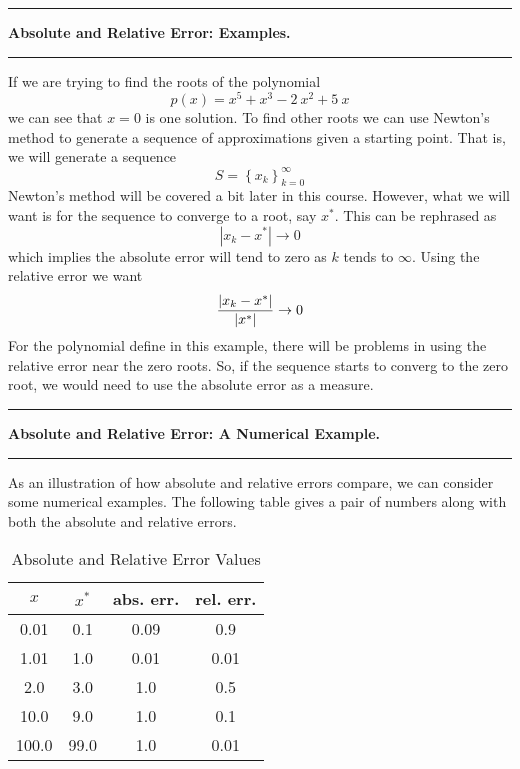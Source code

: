 \documentclass[10pt,fleqn]{article}
\begin{document}
\vskip0.1in\hrule\vskip0.1in
\noindent
{\bf Absolute and Relative Error: Examples.} 
\vskip0.1in\hrule\vskip0.1in
\noindent
If we are trying to find the roots of the polynomial
$$
  p(x) = x^5 + x^3 - 2\ x^2 + 5\ x
$$
we can see that $x=0$ is one solution. To find other roots we can use Newton's
method to generate a sequence of approximations given a starting point. That is,
we will generate a sequence
$$
   S = \left\lbrace x_k \right\rbrace_{k=0}^{\infty}
$$
Newton's method will be covered a bit later in this course. However, what we
will want is for the sequence to converge to a root, say $x^*$. This can be
rephrased as
$$ | x_k - x^* | \rightarrow 0 $$
which implies the absolute error will tend to zero as $k$ tends to $\infty$.
Using the relative error we want
$$ {{ | x_k - x^* | }\over{ | x^* | }} \rightarrow 0 $$
For the polynomial define in this example, there will be problems in using the
relative error near the zero roots. So, if the sequence starts to converg to the
zero root, we would need to use the absolute error as a measure.

\vskip0.1in\hrule\vskip0.1in
\noindent
{\bf Absolute and Relative Error: A Numerical Example.} 
\vskip0.1in\hrule\vskip0.1in
\noindent
As an illustration of how absolute and relative errors compare, we can consider
some numerical examples. The following table gives a pair of numbers along with
both the absolute and relative errors.

\begin{table}[h!]
   \caption{Absolute and Relative Error Values}
   \begin{center}
   \begin{tabular}{c|c|c|c}
     \hline
     \textbf{$x$} & \textbf{$x^*$} & \textbf{abs. err.} & \textbf{rel. err.} \\
     \hline
     0.01 & 0.1 & 0.09 & 0.9 \\
     \hline
     1.01 & 1.0 & 0.01 & 0.01 \\
     \hline
     2.0   & 3.0  & 1.0 & 0.5 \\
     \hline
     10.0  & 9.0  & 1.0 & 0.1 \\
     \hline
     100.0 & 99.0 & 1.0 & 0.01 \\
     \hline
   \end{tabular}
   \end{center}
\end{table}
\end{document}
